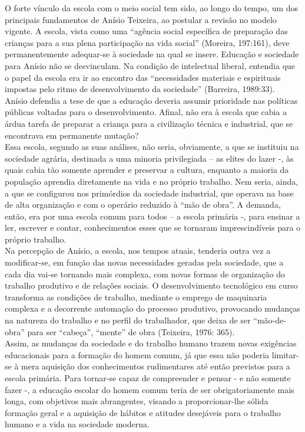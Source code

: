 O forte vínculo da escola com o meio social tem sido, ao longo do tempo, um
dos principais fundamentos de Anísio Teixeira, ao postular a revisão no modelo vigente.
A escola, vista como uma “agência social específica de preparação das crianças para a
sua plena participação na vida social” (Moreira, 197:161), deve permanentemente
adequar-se à sociedade na qual se insere. Educação e sociedade para Anísio não se
desvinculam. Na condição de intelectual liberal, entendia que o papel da escola era ir ao
encontro das “necessidades materiais e espirituais impostas pelo ritmo de
desenvolvimento da sociedade” (Barreira, 1989:33).\\

Anísio defendia a tese de que a educação deveria assumir prioridade nas
políticas públicas voltadas para o desenvolvimento. Afinal, não era à escola que cabia a
árdua tarefa de preparar a criança para a civilização técnica e industrial, que se
encontrava em permanente mutação? \\

Essa escola, segundo as suas análises, não seria, obviamente, a que se instituiu
na sociedade agrária, destinada a uma minoria privilegiada – as elites do lazer -, às
quais cabia tão somente aprender e preservar a cultura, enquanto a maioria da população
aprendia diretamente na vida e no próprio trabalho. Nem seria, ainda, a que se
configurou nos primórdios da sociedade industrial, que operava na base de alta
organização e com o operário reduzido à “mão de obra”. A demanda, então, era por uma
escola comum para todos – a escola primária -, para ensinar a ler, escrever e contar,
conhecimentos esses que se tornaram imprescindíveis para o próprio trabalho. \\

Na percepção de Anísio, a escola, nos tempos atuais, tenderia outra vez a
modificar-se, em função das novas necessidades geradas pela sociedade, que a cada dia
vai-se tornando mais complexa, com novas formas de organização do trabalho
produtivo e de relações sociais. O desenvolvimento tecnológico em curso transforma as
condições de trabalho, mediante o emprego de maquinaria complexa e a decorrente
automação do processo produtivo, provocando mudanças na natureza do trabalho e no
perfil do trabalhador, que deixa de ser “mão-de-obra” para ser “cabeça”, “mente” de
obra (Teixeira, 1976: 365). \\

Assim, as mudanças da sociedade e do trabalho humano trazem novas
exigências educacionais para a formação do homem comum, já que essa não poderia
limitar-se à mera aquisição dos conhecimentos rudimentares até então previstos para a
escola primária. Para tornar-se capaz de compreender e pensar - e não somente fazer -,
a educação escolar do homem comum teria de ser obrigatoriamente mais longa, com
objetivos mais abrangentes, visando a proporcionar-lhe sólida formação geral e a
aquisição de hábitos e atitudes desejáveis para o trabalho humano e a vida na sociedade
moderna.\\

